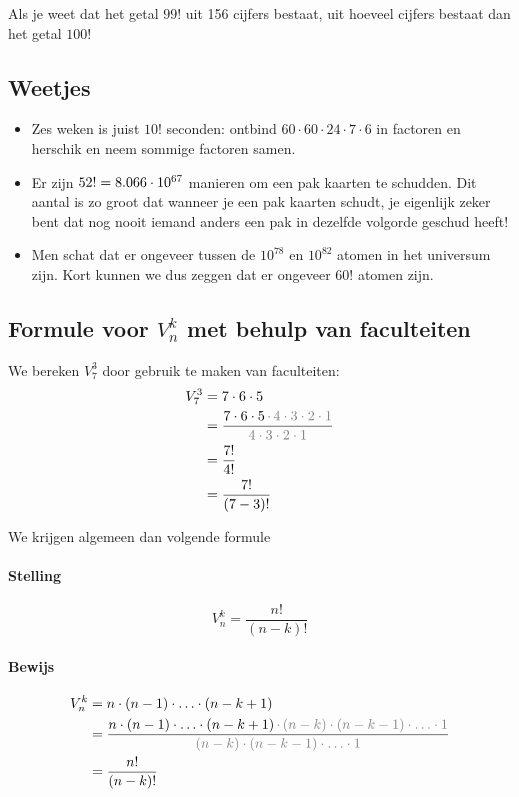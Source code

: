 \documentclass[12pt,a4paper,twoside]{article}
\begin{document}
\begin{oefening}
Als je weet dat het getal $99!$ uit 156 cijfers bestaat, uit hoeveel cijfers bestaat dan het getal $100!$
\end{oefening}

\subsection*{Weetjes}
\begin{itemize}
  \item Zes weken is juist $10!$ seconden: ontbind $60\cdot 60\cdot 24\cdot 7\cdot 6$ in factoren en herschik en neem sommige factoren samen.
  \item Er zijn $52!=8.066\cdot 10^{67}$ manieren om een pak kaarten te schudden. Dit aantal is zo groot dat wanneer je een pak kaarten schudt, je eigenlijk zeker bent dat nog nooit iemand anders een pak in dezelfde volgorde geschud heeft!
  \item Men schat dat er ongeveer tussen de $10^{78}$ en $10^{82}$ atomen in het universum zijn. Kort kunnen we dus zeggen dat er ongeveer $60!$ atomen zijn.
\end{itemize}

\subsection{Formule voor $V^k_n$ met behulp van faculteiten}

We bereken $V^3_7$ door gebruik te maken van faculteiten:
\begin{align*}
  V^3_7 &= 7 \cdot 6 \cdot 5\\
        &= \dfrac{7 \cdot 6 \cdot 5 \, \color{gray}{ \cdot \, 4 \cdot 3 \cdot 2 \cdot 1}}{\color{gray}{4 \cdot 3 \cdot 2 \cdot 1}}\\
        &= \dfrac{7!}{4!}\\
        &= \dfrac{7!}{(7-3)!}\\
\end{align*}

We krijgen algemeen dan volgende formule

\paragraph*{Stelling}
\begin{mdframed}
$$V^k_n=\dfrac{n!}{(n-k)!}$$
\end{mdframed}

\paragraph*{Bewijs}
\begin{align*}
  V^k_n &= n \cdot (n-1) \cdot \ldots \cdot (n-k+1)\\
        &= \dfrac{n \cdot (n-1) \cdot \ldots \cdot (n-k+1) \, \color{gray}{ \cdot \, (n-k) \cdot (n-k-1) \cdot \ldots \cdot 1}}{\color{gray}{(n-k) \cdot (n-k-1) \cdot \ldots \cdot 1}}\\
        &= \dfrac{n!}{(n-k)!}\\
\end{align*}
\end{document}
